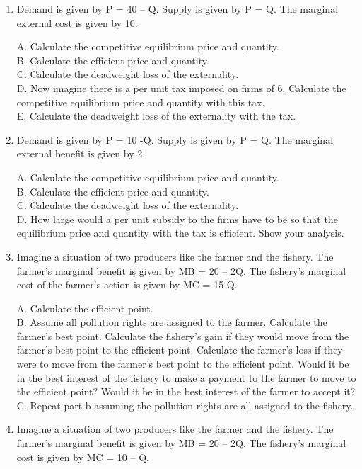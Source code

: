 \documentclass[
]{book}
\begin{document}
\begin{enumerate}
\def\labelenumi{\arabic{enumi}.}
\item
  Demand is given by P = 40 -- Q. Supply is given by P = Q. The marginal external cost is given by 10.

  A. Calculate the competitive equilibrium price and quantity.\\
  B. Calculate the efficient price and quantity.\\
  C. Calculate the deadweight loss of the externality.\\
  D. Now imagine there is a per unit tax imposed on firms of 6. Calculate the competitive equilibrium price and quantity with this tax.\\
  E. Calculate the deadweight loss of the externality with the tax.
\item
  Demand is given by P = 10 -Q. Supply is given by P = Q. The marginal external benefit is given by 2.

  A. Calculate the competitive equilibrium price and quantity.\\
  B. Calculate the efficient price and quantity.\\
  C. Calculate the deadweight loss of the externality.\\
  D. How large would a per unit subsidy to the firms have to be so that the equilibrium price and quantity with the tax is efficient. Show your analysis.
\item
  Imagine a situation of two producers like the farmer and the fishery. The farmer's marginal benefit is given by MB = 20 -- 2Q. The fishery's marginal cost of the farmer's action is given by MC = 15-Q.

  A. Calculate the efficient point.\\
  B. Assume all pollution rights are assigned to the farmer. Calculate the farmer's best point. Calculate the fishery's gain if they would move from the farmer's best point to the efficient point. Calculate the farmer's loss if they were to move from the farmer's best point to the efficient point. Would it be in the best interest of the fishery to make a payment to the farmer to move to the efficient point? Would it be in the best interest of the farmer to accept it?\\
  C. Repeat part b assuming the pollution rights are all assigned to the fishery.
\item
  Imagine a situation of two producers like the farmer and the fishery. The farmer's marginal benefit is given by MB = 20 -- 2Q. The fishery's marginal cost is given by MC = 10 -- Q.


\end{enumerate}
\end{document}
